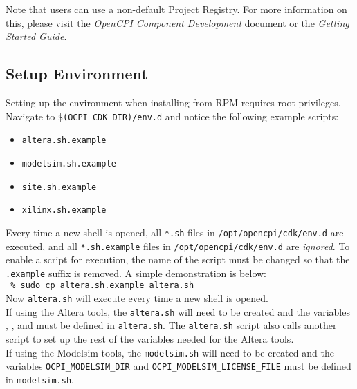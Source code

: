 Note that users can use a non-default Project Registry. For more information on this, please visit the \textit{OpenCPI Component Development} document or the \textit{Getting Started Guide}.

\subsection{Setup Environment} \label{setenv}
\label{subsec:setup_environment}

Setting up the environment when installing from RPM requires root privileges. Navigate to \verb+$(OCPI_CDK_DIR)/env.d+ and notice the following example scripts:

\begin{itemize}
 	\item \verb+altera.sh.example+
 	\item \verb+modelsim.sh.example+
 	\item \verb+site.sh.example+
 	\item \verb+xilinx.sh.example+
\end{itemize}

Every time a new shell is opened, all \verb+*.sh+ files in \verb+/opt/opencpi/cdk/env.d+ are executed, and all \verb+*.sh.example+ files in \verb+/opt/opencpi/cdk/env.d+ are \textit{ignored}. To enable a script for execution, the name of the script must be changed so that the \verb+.example+ suffix is removed. A simple demonstration is below:\\

\verb+ % sudo cp altera.sh.example altera.sh+\\

Now \verb+altera.sh+ will execute every time a new shell is opened.\\

If using the Altera tools, the \verb+altera.sh+ will need to be created and the variables , , and  must be defined in \verb+altera.sh+. The \verb+altera.sh+ script also calls another script to set up the rest of the variables needed for the Altera tools.\\

If using the Modelsim tools, the \verb+modelsim.sh+ will need to be created and the variables \verb+OCPI_MODELSIM_DIR+ and \verb+OCPI_MODELSIM_LICENSE_FILE+ must be defined in \verb+modelsim.sh+.\\

